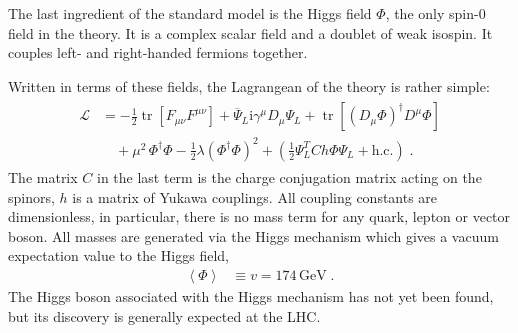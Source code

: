 \documentclass[12pt]{report}
\renewcommand{\L}{\ensuremath{\mathscr{L}}}
\DeclareMathOperator{\tr}{tr}
\renewcommand{\i}{\ensuremath{\text{i}}}
\newcommand{\2}{\ensuremath{\sqrt{2}\,}}
\renewcommand{\L}{\ensuremath{\mathscr{L}}}
\begin{document}
    The last ingredient of the standard model is the Higgs field $\Phi$, the only spin-0 field in
    the theory. It is a complex scalar field and a doublet of weak isospin. It couples 
    left- and right-handed fermions together.

    Written in terms of these fields, the Lagrangean of the theory is rather simple: 
    \begin{align}\label{eq:smlagrangean1}
      \begin{split}
        \L&= -\frac{1}{2} \tr \left[F_{\mu\nu} F^{\mu\nu}\right] +\overline{\Psi}_L \i \gamma^\mu
        D_\mu \Psi_L +\tr \left[\left(D_\mu \Phi\right)^\dagger D^\mu \Phi\right]\\
        &\quad +\mu^2 \,\Phi^\dagger\Phi -\frac{1}{2}\lambda \left(\Phi^\dagger\Phi\right)^2
        +\left(\frac{1}{2}   \Psi^T_L C h \Phi \Psi_L + \text{h.c.}\right)\;.
      \end{split}
    \end{align}
    The matrix $C$ in the last term is the charge conjugation matrix acting on the spinors, $h$ is a
    matrix of Yukawa couplings. All coupling constants are dimensionless, in particular, there is no
    mass term for any quark, lepton or vector boson. All masses are generated via the Higgs mechanism 
    which gives a vacuum
    expectation value to the Higgs field,
    \begin{align}
      \left\langle \Phi \right\rangle &\equiv v = 174\, \text{GeV}\;.
    \end{align}
    The Higgs boson associated with the Higgs mechanism has not yet been found, but its discovery
    is generally expected at the LHC.
\end{document}
